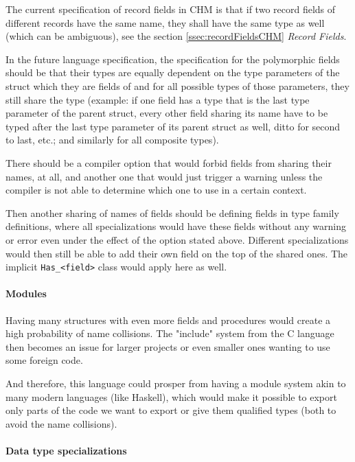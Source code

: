 The current specification of record fields in CHM is that if two record fields of different records have the same name, they shall have the same type as well (which can be ambiguous), see the section \ref{ssec:recordFieldsCHM} \emph{Record Fields}.

In the future language specification, the specification for the polymorphic fields should be that their types are equally dependent on the type parameters of the struct which they are fields of and for all possible types of those parameters, they still share the type (example: if one field has a type that is the last type parameter of the parent struct, every other field sharing its name have to be typed after the last type parameter of its parent struct as well, ditto for second to last, etc.; and similarly for all composite types).

There should be a compiler option that would forbid fields from sharing their names, at all, and another one that would just trigger a warning unless the compiler is not able to determine which one to use in a certain context.

Then another sharing of names of fields should be defining fields in type family definitions, where all specializations would have these fields without any warning or error even under the effect of the option stated above. Different specializations would then still be able to add their own field on the top of the shared ones. The implicit \lstinline{Has_<field>} class would apply here as well.

\paragraph{Modules}

Having many structures with even more fields and procedures would create a high probability of name collisions. The "include" system from the C language then becomes an issue for larger projects or even smaller ones wanting to use some foreign code.

And therefore, this language could prosper from having a module system akin to many modern languages (like Haskell), which would make it possible to export only parts of the code we want to export or give them qualified types (both to avoid the name collisions).

\paragraph{Data type specializations}

